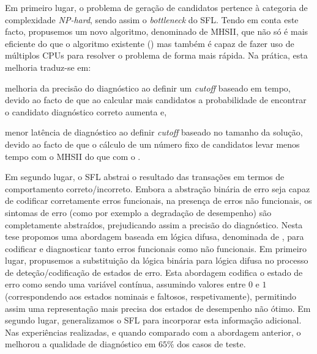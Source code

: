 Em primeiro lugar, o problema de geração de candidatos pertence à
categoria de complexidade \emph{NP-hard}, sendo assim o \emph{bottleneck} do
\ac{SFL}.
%
Tendo em conta este facto, propusemos um novo algoritmo, denominado de
\acs{MHSII}, que não só é mais eficiente do que o algoritmo existente
(\staccato{}) mas também é capaz de fazer uso de múltiplos \acsp{CPU}
para resolver o problema de forma mais rápida.
%
Na prática, esta melhoria traduz-se em:
\begin {inparaenum} [(1)]
\item melhoria da precisão do diagnóstico ao definir um \emph{cutoff}
  baseado em tempo, devido ao facto de que ao calcular mais candidatos
  a probabilidade de encontrar o candidato diagnóstico correto aumenta
  e,
\item menor latência de diagnóstico ao definir \emph{cutoff} baseado no
  tamanho da solução, devido ao facto de que o cálculo de um número
  fixo de candidatos levar menos tempo com o \acs{MHSII} do que com o
  \staccato{}.
\end {inparaenum}


Em segundo lugar, o \ac{SFL} abstrai o resultado das transações em
termos de comportamento correto/incorreto.
%
Embora a abstração binária de erro seja capaz de codificar
corretamente erros funcionais, na presença de erros não funcionais, os
sintomas de erro (como por exemplo a degradação de desempenho) são
completamente abstraídos, prejudicando assim a precisão do
diagnóstico.
%
Nesta tese propomos uma abordagem baseada em lógica difusa, denominada
de \fuzzinel{}, para codificar e diagnosticar tanto erros funcionais
como não funcionais.
%
Em primeiro lugar, propusemos a substituição da lógica binária para
lógica difusa no processo de deteção/codificação de estados de erro.
%
Esta abordagem codifica o estado de erro como sendo uma variável
contínua, assumindo valores entre $0$ e $1$ (correspondendo aos
estados nominais e faltosos, respetivamente), permitindo assim uma
representação mais precisa dos estados de desempenho não ótimo.
%
Em segundo lugar, generalizamos o \ac{SFL} para incorporar esta
informação adicional.
%
Nas experiências realizadas, e quando comparado com a abordagem
anterior, o \fuzzinel{} melhorou a qualidade de diagnóstico em $65\%$
dos casos de teste.



